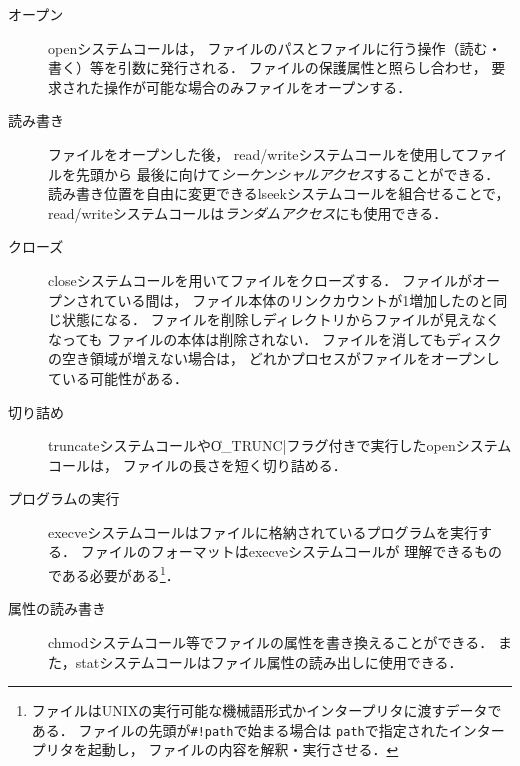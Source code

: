 \begin{description}
\item[オープン]
  openシステムコールは，
  ファイルのパスとファイルに行う操作（読む・書く）等を引数に発行される．
  ファイルの保護属性と照らし合わせ，
  要求された操作が可能な場合のみファイルをオープンする．
\item[読み書き]
  ファイルをオープンした後，
  read/writeシステムコールを使用してファイルを先頭から
  最後に向けて\emph{シーケンシャルアクセス}することができる．
  読み書き位置を自由に変更できるlseekシステムコールを組合せることで，
  read/writeシステムコールは\emph{ランダムアクセス}にも使用できる．
\item[クローズ]
  closeシステムコールを用いてファイルをクローズする．
  ファイルがオープンされている間は，
  ファイル本体のリンクカウントが1増加したのと同じ状態になる．
  ファイルを削除しディレクトリからファイルが見えなくなっても
  ファイルの本体は削除されない．
  ファイルを消してもディスクの空き領域が増えない場合は，
  どれかプロセスがファイルをオープンしている可能性がある．
\item[切り詰め]
  truncateシステムコールや\|O_TRUNC|フラグ付きで実行したopenシステムコールは，
  ファイルの長さを短く切り詰める．
\item[プログラムの実行]
  execveシステムコールはファイルに格納されているプログラムを実行する．
  ファイルのフォーマットはexecveシステムコールが
  理解できるものである必要がある\footnote{
    ファイルはUNIXの実行可能な機械語形式かインタープリタに渡すデータである．
    ファイルの先頭が\texttt{\#!path}で始まる場合は
    \texttt{path}で指定されたインタープリタを起動し，
    ファイルの内容を解釈・実行させる．
  }．
\item[属性の読み書き]
  chmodシステムコール等でファイルの属性を書き換えることができる．
  また，statシステムコールはファイル属性の読み出しに使用できる．
\end{description}

